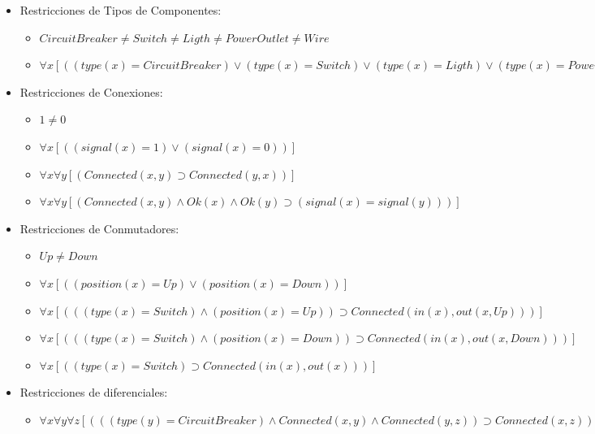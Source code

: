 \documentclass[10pt, a4paper,spanish]{article}
\begin{document}
			\begin{itemize}

				\item Restricciones de Tipos de Componentes:
				\begin{itemize}
					\item $ CircuitBreaker \neq Switch\neq Ligth \neq PowerOutlet \neq Wire   $
					\item $ \forall x [((type(x) = CircuitBreaker) \lor (type(x) = Switch) \lor (type(x) = Ligth) \lor (type(x) = PowerOutlet) \lor (type(x) = Wire))] $
				\end{itemize}
				\item Restricciones de Conexiones:
				\begin{itemize}
					\item $ 1 \neq 0 $
					\item $ \forall x [((signal(x) = 1) \lor (signal(x) = 0))] $
					\item $ \forall x \forall y [(Connected(x, y) \supset Connected(y, x))] $
					\item $ \forall x \forall y [(Connected(x, y) \land Ok(x) \land Ok(y) \supset (signal(x) = signal(y)))] $
				\end{itemize}

				\item Restricciones de Conmutadores:
				\begin{itemize}
					\item $ Up \neq Down $
					\item $ \forall x [( (position(x) = Up) \lor (position(x) = Down))] $
					\item $ \forall x [( ( (type(x) = Switch) \land (position(x) = Up) ) \supset Connected(in(x), out(x, Up)))] $
					\item $ \forall x [( ( (type(x) = Switch) \land (position(x) = Down) ) \supset Connected(in(x), out(x, Down)))] $
					\item $ \forall x [( (type(x) = Switch)  \supset Connected(in(x), out(x)))] $
				\end{itemize}

				\item Restricciones de diferenciales:
				\begin{itemize}
					\item $ \forall x \forall y \forall z [( ((type(y) = CircuitBreaker) \land Connected(x, y) \land Connected(y, z) ) \supset Connected(x, z))] $
				\end{itemize}


\end{itemize}
\end{document}
